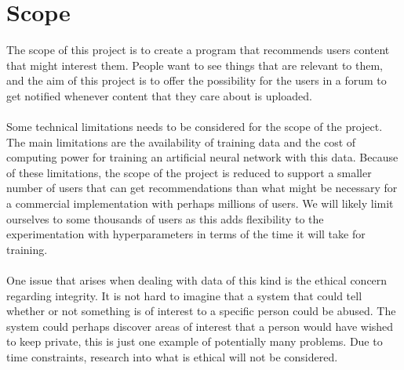 \section{Scope}
The scope of this project is to create a program that recommends users content that might interest them. People want to see things that are relevant to them, and the aim of this project is to offer the possibility for the users in a forum to get notified whenever content that they care about is uploaded. %
\\\\
Some technical limitations needs to be considered for the scope of the project. The main limitations are the availability of training data and the cost of computing power for training an artificial neural network with this data. Because of these limitations, the scope of the project is reduced to support a smaller number of users that can get recommendations than what might be necessary for a commercial implementation with perhaps millions of users. We will likely limit ourselves to some thousands of users as this adds flexibility to the experimentation with hyperparameters in terms of the time it will take for training.  
\\\\
One issue that arises when dealing with data of this kind is the ethical concern regarding integrity. It is not hard to imagine that a system that could tell whether or not something is of interest to a specific person could be abused. The system could perhaps discover areas of interest that a person would have wished to keep private, this is just one example of potentially many problems. Due to time constraints, research into what is ethical will not be considered. 

